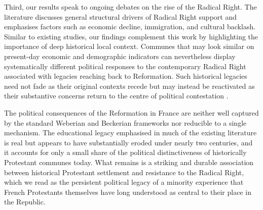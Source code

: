 \documentclass[12pt]{article}
\begin{document}
Third, our results speak to ongoing debates on the rise of the Radical Right. The literature discusses general structural drivers of Radical Right support and emphasises factors such as economic decline, immigration, and cultural backlash. Similar to existing studies, our findings complement this work by highlighting the importance of deep historical local context. Communes that may look similar on present-day economic and demographic indicators can nevertheless display systematically different political responses to the contemporary Radical Right associated with legacies reaching back to Reformation. Such historical legacies need not fade as their original contexts recede but may instead be reactivated as their substantive concerns return to the centre of political contestation \parencite{wittenbergCruciblesPoliticalLoyalty2006, foukaCollectiveRemembrancePrivate2023, ochsnerActivatedHistoryCase2024, dinasInterruptedContinuitiesLocal2024}.

The political consequences of the Reformation in France are neither well captured by the standard Weberian and Beckerian frameworks nor reducible to a single mechanism. The educational legacy emphasised in much of the existing literature is real but appears to have substantially eroded under nearly two centuries, and it accounts for only a small share of the political distinctiveness of historically Protestant communes today. What remains is a striking and durable association between historical Protestant settlement and resistance to the Radical Right, which we read as the persistent political legacy of a minority experience that French Protestants themselves have long understood as central to their place in the Republic.

\clearpage

\printbibliography

\newpage


\end{document}
